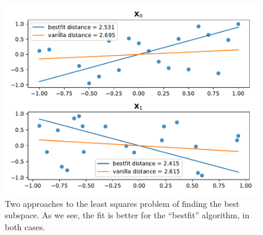 \documentclass[article, a4paper, oneside, 12pt]{memoir}
\begin{document}
\begin{figure}[htbp]
    \centering
    \includegraphics[width=0.8\linewidth]{pictures/best_subspace.pdf}
    \caption{Two approaches to the least squares problem of finding the best
    subspace. As we see, the fit is better for the ``bestfit'' algorithm, in
both cases.}
    \label{fig:result}
\end{figure}
\end{document}
